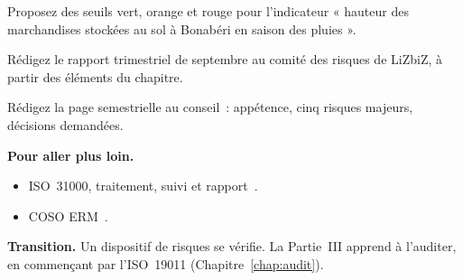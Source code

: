 \begin{boxexo}[title={\ding{45}\quad Exercice~11.8. Seuils \niveaumoyen}]
Proposez des seuils vert, orange et rouge pour l'indicateur « hauteur des
marchandises stockées au sol à Bonabéri en saison des pluies ».
\end{boxexo}

\begin{boxexo}[title={\ding{45}\quad Exercice~11.9. Le rapport \niveauexpert}]
Rédigez le rapport trimestriel de septembre au comité des risques de
LiZbiZ, à partir des éléments du chapitre.
\end{boxexo}

\begin{boxexo}[title={\ding{45}\quad Exercice~11.10. La page du conseil \niveauexpert}]
Rédigez la page semestrielle au conseil~: appétence, cinq risques majeurs,
décisions demandées.
\end{boxexo}

\bigskip

\begin{boxinfo}
\textbf{Pour aller plus loin.}
\begin{itemize}
    \item ISO~31000, traitement, suivi et rapport~\cite{iso31000_2018}.
    \item COSO ERM~\cite{coso2017erm}.
\end{itemize}
\end{boxinfo}

\begin{boxinfo}
\textbf{Transition.} Un dispositif de risques se vérifie. La Partie~III
apprend à l'auditer, en commençant par l'ISO~19011
(Chapitre~\ref{chap:audit}).
\end{boxinfo}
